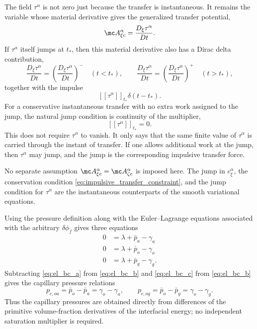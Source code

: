 The field $\tau^\alpha$ is not zero just because the transfer is instantaneous.
It remains the variable whose material derivative gives the generalized transfer
potential,
\begin{equation}
  \mc A_{\xi c}^\alpha = \frac{D_\xi\tau^\alpha}{Dt} .
\end{equation}
If $\tau^\alpha$ itself jumps at $t_*$, then this material derivative also has a
Dirac delta contribution,
\begin{equation}
  \frac{D_\xi\tau^\alpha}{Dt}
  = \left(\frac{D_\xi\tau^\alpha}{Dt}\right)^- \quad (t<t_*),
  \qquad
  \frac{D_\xi\tau^\alpha}{Dt}
  = \left(\frac{D_\xi\tau^\alpha}{Dt}\right)^+ \quad (t>t_*),
\end{equation}
together with the impulse
\begin{equation}
  \left[\!\left[\tau^\alpha\right]\!\right]_{t_*}\delta(t-t_*) .
  \label{eq:tau_distributional_derivative}
\end{equation}
For a conservative instantaneous transfer with no extra work assigned to the
jump, the natural jump condition is continuity of the multiplier,
\begin{equation}
  \left[\!\left[\tau^\alpha\right]\!\right]_{t_*}=0 .
  \label{eq:tau_conservative_jump}
\end{equation}
This does not require $\tau^\alpha$ to vanish.  It only says that the same finite
value of $\tau^\alpha$ is carried through the instant of transfer.  If one allows
additional work at the jump, then $\tau^\alpha$ may jump, and the jump is the
corresponding impulsive transfer force.

No separate assumption
$\mc A_{\xi c}^\alpha=\mc A_{\zeta c}^\alpha$ is imposed here.  The jump in
$c_\xi^\alpha$, the conservation condition \eqref{eq:impulsive_transfer_constraint},
and the jump condition for $\tau^\alpha$ are the instantaneous counterparts of
the smooth variational equations.

Using the pressure definition along with the Euler--Lagrange equations associated
with the arbitrary $\delta \phi_{f}$ gives three equations
\begin{subequations}
  \begin{align}
    0 &= \lambda + \bar{p}_a - \gamma_a \label{eq:el_bc_a} \\
    0 &= \lambda + \bar{p}_o - \gamma_o \label{eq:el_bc_b} \\
    0 &= \lambda + \bar{p}_g - \gamma_g . \label{eq:el_bc_c}
  \end{align}
  \label{eq:el_pc}
\end{subequations}
Subtracting \eqref{eq:el_bc_a} from \eqref{eq:el_bc_b} and
\eqref{eq:el_bc_c} from \eqref{eq:el_bc_b} gives the capillary pressure
relations
\begin{equation}
  p_{c,oa}=\bar p_o-\bar p_a=\gamma_o-\gamma_a,
  \qquad
  p_{c,og}=\bar p_o-\bar p_g=\gamma_o-\gamma_g .
  \label{eq:pc_from_phi_variations}
\end{equation}
Thus the capillary pressures are obtained directly from differences of the
primitive volume-fraction derivatives of the interfacial energy; no independent
saturation multiplier is required.

